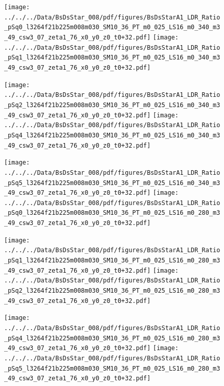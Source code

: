 \documentclass[a4paper,10pt]{article}
\begin{document}
\begin{figure}[p]
 \texttt{[image: ../../../Data/BsDsStar\_008/pdf/figures/BsDsStarA1\_LDR\_Ratio\_pSq0\_l3264f21b225m008m030\_SM10\_36\_PT\_m0\_025\_LS16\_m0\_340\_m3\_49\_csw3\_07\_zeta1\_76\_x0\_y0\_z0\_t0+32.pdf]} 
 \texttt{[image: ../../../Data/BsDsStar\_008/pdf/figures/BsDsStarA1\_LDR\_Ratio\_pSq1\_l3264f21b225m008m030\_SM10\_36\_PT\_m0\_025\_LS16\_m0\_340\_m3\_49\_csw3\_07\_zeta1\_76\_x0\_y0\_z0\_t0+32.pdf]} 
 \end{figure}
\begin{figure}[p]
 \texttt{[image: ../../../Data/BsDsStar\_008/pdf/figures/BsDsStarA1\_LDR\_Ratio\_pSq2\_l3264f21b225m008m030\_SM10\_36\_PT\_m0\_025\_LS16\_m0\_340\_m3\_49\_csw3\_07\_zeta1\_76\_x0\_y0\_z0\_t0+32.pdf]} 
 \texttt{[image: ../../../Data/BsDsStar\_008/pdf/figures/BsDsStarA1\_LDR\_Ratio\_pSq4\_l3264f21b225m008m030\_SM10\_36\_PT\_m0\_025\_LS16\_m0\_340\_m3\_49\_csw3\_07\_zeta1\_76\_x0\_y0\_z0\_t0+32.pdf]} 
 \end{figure}
\begin{figure}[p]
 \texttt{[image: ../../../Data/BsDsStar\_008/pdf/figures/BsDsStarA1\_LDR\_Ratio\_pSq5\_l3264f21b225m008m030\_SM10\_36\_PT\_m0\_025\_LS16\_m0\_340\_m3\_49\_csw3\_07\_zeta1\_76\_x0\_y0\_z0\_t0+32.pdf]} 
 \texttt{[image: ../../../Data/BsDsStar\_008/pdf/figures/BsDsStarA1\_LDR\_Ratio\_pSq0\_l3264f21b225m008m030\_SM10\_36\_PT\_m0\_025\_LS16\_m0\_280\_m3\_49\_csw3\_07\_zeta1\_76\_x0\_y0\_z0\_t0+32.pdf]} 
 \end{figure}
\clearpage
\begin{figure}[p]
 \texttt{[image: ../../../Data/BsDsStar\_008/pdf/figures/BsDsStarA1\_LDR\_Ratio\_pSq1\_l3264f21b225m008m030\_SM10\_36\_PT\_m0\_025\_LS16\_m0\_280\_m3\_49\_csw3\_07\_zeta1\_76\_x0\_y0\_z0\_t0+32.pdf]} 
 \texttt{[image: ../../../Data/BsDsStar\_008/pdf/figures/BsDsStarA1\_LDR\_Ratio\_pSq2\_l3264f21b225m008m030\_SM10\_36\_PT\_m0\_025\_LS16\_m0\_280\_m3\_49\_csw3\_07\_zeta1\_76\_x0\_y0\_z0\_t0+32.pdf]} 
 \end{figure}
\begin{figure}[p]
 \texttt{[image: ../../../Data/BsDsStar\_008/pdf/figures/BsDsStarA1\_LDR\_Ratio\_pSq4\_l3264f21b225m008m030\_SM10\_36\_PT\_m0\_025\_LS16\_m0\_280\_m3\_49\_csw3\_07\_zeta1\_76\_x0\_y0\_z0\_t0+32.pdf]} 
 \texttt{[image: ../../../Data/BsDsStar\_008/pdf/figures/BsDsStarA1\_LDR\_Ratio\_pSq5\_l3264f21b225m008m030\_SM10\_36\_PT\_m0\_025\_LS16\_m0\_280\_m3\_49\_csw3\_07\_zeta1\_76\_x0\_y0\_z0\_t0+32.pdf]} 
 \end{figure}
\clearpage
\end{document}
